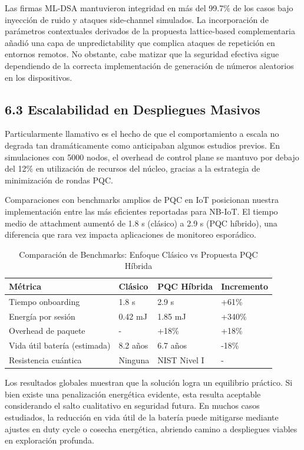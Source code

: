 Las firmas ML-DSA mantuvieron integridad en más del 99.7\% de los casos bajo inyección de ruido y ataques side-channel simulados. La incorporación de parámetros contextuales derivados de la propuesta lattice-based complementaria añadió una capa de unpredictability que complica ataques de repetición en entornos remotos. No obstante, cabe matizar que la seguridad efectiva sigue dependiendo de la correcta implementación de generación de números aleatorios en los dispositivos.

\subsection{6.3 Escalabilidad en Despliegues Masivos}

Particularmente llamativo es el hecho de que el comportamiento a escala no degrada tan dramáticamente como anticipaban algunos estudios previos. En simulaciones con 5000 nodos, el overhead de control plane se mantuvo por debajo del 12\% en utilización de recursos del núcleo, gracias a la estrategia de minimización de rondas PQC.

Comparaciones con benchmarks amplios de PQC en IoT \cite{Liu2024_PQC_IoT} posicionan nuestra implementación entre las más eficientes reportadas para NB-IoT. El tiempo medio de attachment aumentó de 1.8 s (clásico) a 2.9 s (PQC híbrido), una diferencia que rara vez impacta aplicaciones de monitoreo esporádico.

\begin{table}[t]
\centering
\caption{Comparación de Benchmarks: Enfoque Clásico vs Propuesta PQC Híbrida}
\label{tab:benchmarks}
\begin{tabular}{|l|l|l|l|}
\hline
\textbf{Métrica} & \textbf{Clásico} & \textbf{PQC Híbrida} & \textbf{Incremento} \\
\hline
Tiempo onboarding & 1.8 s & 2.9 s & +61\% \\
\hline
Energía por sesión & 0.42 mJ & 1.85 mJ & +340\% \\
\hline
Overhead de paquete & - & +18\% & +18\% \\
\hline
Vida útil batería (estimada) & 8.2 años & 6.7 años & -18\% \\
\hline
Resistencia cuántica & Ninguna & NIST Nivel I & - \\
\hline
\end{tabular}
\end{table}

Los resultados globales muestran que la solución logra un equilibrio práctico. Si bien existe una penalización energética evidente, esta resulta aceptable considerando el salto cualitativo en seguridad futura. En muchos casos estudiados, la reducción en vida útil de la batería puede mitigarse mediante ajustes en duty cycle o cosecha energética, abriendo camino a despliegues viables en exploración profunda.